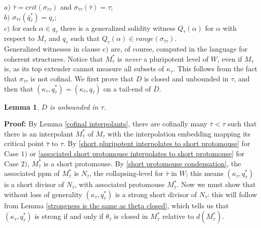 \documentclass[12pt]{article}
\newtheorem{lem}[thm]{Lemma}
\begin{document}
\indent \indent $a)$ $\bar{\tau} = crit (\sigma_{\bar{\tau} \tau })$ and $\sigma_{\bar{\tau} \tau } (\bar{\tau}) = \tau $;\\

\indent \indent $b)$ $\sigma_{\bar{\tau} \tau } (\bar{q}_{\bar{\tau}}^*) = q_\tau$;\\

\indent \indent $c)$ for each $\alpha \in q_\tau$ there is a generalized solidity witness $Q_\tau (\alpha )$ for $\alpha$ with respect to $M_\tau$ and $q_\tau$ such that $Q_\tau (\alpha ) \in range ( \sigma_{\bar{\tau} \tau } )$.\\


Generalized witnesses in clause $c)$ are, of course, computed in the language for coherent structures.  Notice that $M_{\bar{\tau}}^*$ is \textit{never} a pluripotent level of $W$, even if $M_\tau$ is, as its top extender cannot measure all subsets of $\kappa_\tau$.  This follows from the fact that $\sigma_{\bar{\tau} \tau}$ is not cofinal.  We first prove that $D$ is closed and unbounded in $\tau$, and then that $( \kappa_\tau , q_{\bar{\tau}}^*) = ( \kappa_{\bar{\tau}} , q_{\bar{\tau}})$ on a tail-end of $D$.\\

\begin{lem}
$D$ is unbounded in $\tau$.
\end{lem}

\textbf{Proof:}  By Lemma \ref{cofinal interpolants}, there are cofinally many $\bar{\tau} < \tau$ such that there is an interpolant $M^*_{\bar{\tau}}$ of $M_\tau$ with the interpolation embedding mapping its critical point $\bar{\tau}$ to $\tau$.  By \ref{short pluripotent interpolates to short protomouse} for Case $1)$ or \ref{associated short protomouse interpolates to short protomouse} for Case $2)$, $M^*_{\bar{\tau}}$ is a short protomouse.  By \ref{short protomouse condensation}, the associated ppm of $M^*_{\bar{\tau}}$ is $N_{\bar{\tau}}$, the collapsing-level for $\bar{\tau}$ in $W$; this means $(\kappa_\tau , q_{\bar{\tau}}^*)$ is a short divisor of $N_{\bar{\tau}}$, with associated protomouse $M^*_{\bar{\tau}}$.  Now we must show that without loss of generality $(\kappa_\tau , q_{\bar{\tau}}^*)$ is a strong short divisor of $N_{\bar{\tau}}$: this will follow from Lemma \ref{strongness is the same as theta closed}, which tells us that $(\kappa_\tau , q_{\bar{\tau}}^*)$ is strong if and only if $\theta_{\bar{\tau}}$ is closed in $M^*_{\bar{\tau}}$ relative to $d(M^*_{\bar{\tau}})$.\\
\end{document}
